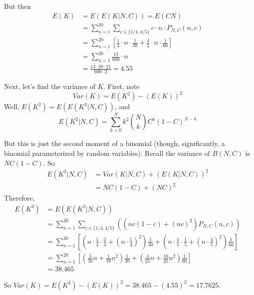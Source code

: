 \documentclass[paper=a4, fontsize=11pt]{scrartcl} %
\numberwithin{equation}{section} %
\numberwithin{figure}{section} %
\numberwithin{table}{section} %
\begin{document}
But then
\begin{align*}
E(K) &= E(E(K | N,C)) = E(CN)\\
   &= \sum_{n = 1}^{20} \sum_{c \in \{1/4, 4/5\}} c \cdot n \cdot P_{N, C} (n,c) \\
   &= \sum_{n = 1}^{20} \left[\frac{1}{4}\cdot n \cdot \frac{1}{30} + \frac{4}{5} \cdot n\cdot \frac{1}{60} \right] \\
   &= \sum_{n = 1}^{20} \frac{13}{600} \cdot n \\
   &= \frac{13 \cdot 20 \cdot 21}{600 \cdot 2} = 4.55
\end{align*}

Next, let's find the variance of $K$. First, note
\[Var(K) = E(K^2) - (E(K))^2\]
Well, $E(K^2) = E(E(K^2 | N, C))$, and
\[E(K^2 | N, C) = \sum_{k = 0}^N k^2 {N \choose k} C^k (1-C)^{N-k}\]

But this is just the second moment of a binomial (though, significantly, a binomial parameterized by random variables). Recall the variance of $B(N,C)$ is $NC(1-C)$. So
\begin{align*}
E(K^2 | N, C) &= Var(K | N, C) + (E(K | N, C))^2 \\
   &= NC(1-C) + (NC)^2
\end{align*}
Therefore,
\begin{align*}
E(K^2) &= E(E(K^2 | N, C)) \\
   &= \sum_{n = 1}^{20} \sum_{c \in \{1/4, 4/5\}} \left((n c (1-c) + (n c)^2) P_{N, C} (n,c)\right) \\
   &= \sum_{n = 1}^{20}\left[ \left(n \cdot \frac{1}{4} \cdot\frac{3}{4} + \left(n \cdot \frac{1}{4}\right)^2 \right) \frac{1}{30} + \left(n \cdot \frac{4}{5} \cdot \frac{1}{5} + \left(n \cdot \frac{4}{5}\right)^2 \right) \frac{1}{60} \right] \\
   &=  \sum_{n = 1}^{20}\left[ \left( \frac{3}{16} n + \frac{1}{16} n^2 \right) \frac{1}{30} + \left(\frac{4}{25}  n + \frac{16}{25} n^2 \right) \frac{1}{60} \right]\\
   &= 38.465
\end{align*}

So $Var(K) = E(K^2) - (E(K))^2 = 38.465 - (4.55)^2 = 17.7625$.
\end{document}
